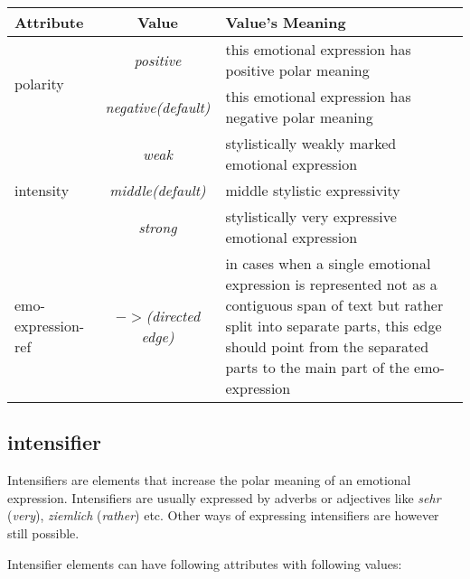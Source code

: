 \documentclass[11pt,a4paper]{article}
\begin{document}
\begin{tabular}{|l|c|p{}|}\hline
  Attribute & Value & Value's Meaning\\\hline

  \multirow{2}{*}{polarity} & \textit{positive} & this emotional
  expression has positive polar meaning\\\cline{2-3}

  & \textit{negative\newline(default)} & this emotional expression has
  negative polar meaning\\\hline


  \multirow{3}{*}{intensity} & \textit{weak} & stylistically weakly
  marked emotional expression\\\cline{2-3}

  & \textit{middle\newline(default)} & middle stylistic
  expressivity\\\cline{2-3}

  & \textit{strong} & stylistically very expressive emotional
  expression\\\hline


  emo-expression-ref & \textit{$->$\newline(directed edge)} & in cases
  when a single emotional expression is represented not as a
  contiguous span of text but rather split into separate parts, this
  edge should point from the separated parts to the main part of the
  emo-expression\\\hline
\end{tabular}

\subsection{intensifier}
Intensifiers are elements that increase the polar meaning of an
emotional expression.  Intensifiers are usually expressed by adverbs
or adjectives like \textit{sehr} (\textit{very}), \textit{ziemlich}
(\textit{rather}) etc.  Other ways of expressing intensifiers are
however still possible.

Intensifier elements can have following attributes with following
values:
\end{document}
